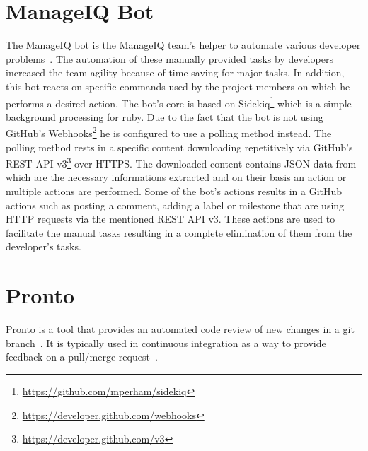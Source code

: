\section{ManageIQ Bot}

The ManageIQ bot is the ManageIQ team's helper to automate various developer problems~\cite{MIQBOT}. The automation of these manually provided tasks by developers increased the team agility because of time saving for major tasks. In addition, this bot reacts on specific commands used by the project members on which he performs a desired action. The bot's core is based on Sidekiq\footnote{\url{https://github.com/mperham/sidekiq}} which is a simple background processing for ruby. Due to the fact that the bot is not using GitHub's Webhooks\footnote{\url{https://developer.github.com/webhooks}} he is configured to use a polling method instead. The polling method rests in a specific content downloading repetitively via GitHub's REST API v3\footnote{\url{https://developer.github.com/v3}} over HTTPS. The downloaded content contains JSON data from which are the necessary informations extracted and on their basis an action or multiple actions are performed. Some of the bot's actions results in a GitHub actions such as posting a comment, adding a label or milestone that are using HTTP requests via the mentioned REST API v3. These actions are used to facilitate the manual tasks resulting in a complete elimination of them from the developer's tasks.

\section{Pronto}

Pronto is a tool that provides an automated code review of new changes in a git branch~\cite{PRONTO-1}. It is typically used in continuous integration as a way to provide feedback on a pull/merge request~\cite{PRONTO-1}.\\

